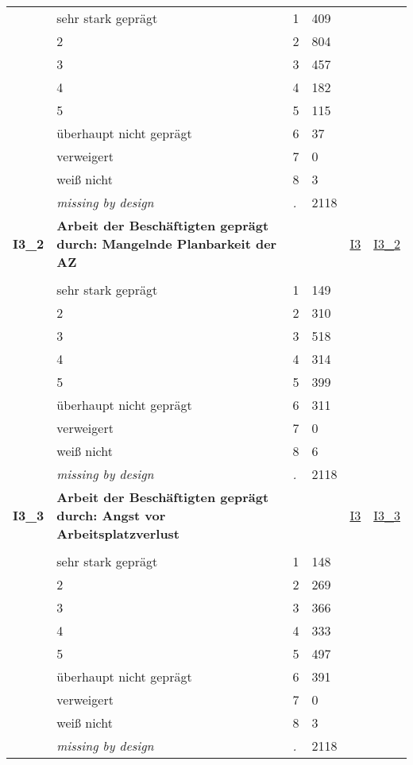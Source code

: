\begin{longtable}{| L{2.45cm} | L{6cm} | C{1.5cm} | R{1cm} | C{2.25cm} | C{2.25cm} |}
   & sehr stark geprägt & 1 & 409 &  &  \\ 
   & 2 & 2 & 804 &  &  \\ 
   & 3 & 3 & 457 &  &  \\ 
   & 4 & 4 & 182 &  &  \\ 
   & 5 & 5 & 115 &  &  \\ 
   & überhaupt nicht geprägt & 6 & 37 &  &  \\ 
   & verweigert & 7 & 0 &  &  \\ 
   & weiß nicht & 8 & 3 &  &  \\ 
   & \textit{missing by design} & \textit{.} & 2118 &  &  \\ 
   \midrule
\textbf{I3\_2}\label{var:I3:2} & \textbf{Arbeit der Beschäftigten geprägt durch: Mangelnde Planbarkeit der AZ} &  &  & \hyperref[I3]{I3} & \hyperref[var:suf:I3:2]{I3\_2} \\ 
   &  &  &  &  &  \\ 
   & sehr stark geprägt & 1 & 149 &  &  \\ 
   & 2 & 2 & 310 &  &  \\ 
   & 3 & 3 & 518 &  &  \\ 
   & 4 & 4 & 314 &  &  \\ 
   & 5 & 5 & 399 &  &  \\ 
   & überhaupt nicht geprägt & 6 & 311 &  &  \\ 
   & verweigert & 7 & 0 &  &  \\ 
   & weiß nicht & 8 & 6 &  &  \\ 
   & \textit{missing by design} & \textit{.} & 2118 &  &  \\ 
   \midrule
\textbf{I3\_3}\label{var:I3:3} & \textbf{Arbeit der Beschäftigten geprägt durch: Angst vor Arbeitsplatzverlust} &  &  & \hyperref[I3]{I3} & \hyperref[var:suf:I3:3]{I3\_3} \\ 
   &  &  &  &  &  \\ 
   & sehr stark geprägt & 1 & 148 &  &  \\ 
   & 2 & 2 & 269 &  &  \\ 
   & 3 & 3 & 366 &  &  \\ 
   & 4 & 4 & 333 &  &  \\ 
   & 5 & 5 & 497 &  &  \\ 
   & überhaupt nicht geprägt & 6 & 391 &  &  \\ 
   & verweigert & 7 & 0 &  &  \\ 
   & weiß nicht & 8 & 3 &  &  \\ 
   & \textit{missing by design} & \textit{.} & 2118 &  &  \\ 

\end{longtable}

